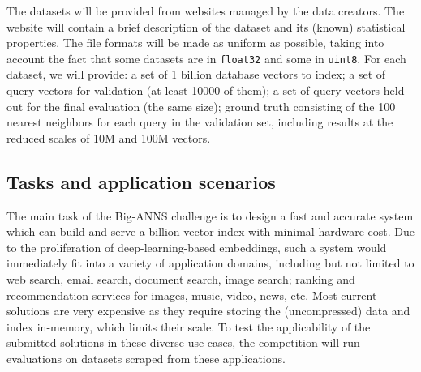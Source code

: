 The datasets will be provided from websites managed by the data creators. 
The website will contain a brief description of the dataset and its (known) statistical properties.
The file formats will be made as uniform as possible, taking into account the fact that some datasets are 
in \texttt{float32} and some in \texttt{uint8}.
For each dataset, we will provide: 
	a set of 1 billion database vectors to index; 
	a set of query vectors for validation (at least 10000 of them); 
	a set of query vectors held out for the final evaluation (the same size);
	ground truth consisting of the 100 nearest neighbors for each query in the validation set, including results at the reduced scales of 10M and 100M vectors.





\subsection{Tasks and application scenarios}

The main task of the Big-ANNS challenge is to design a fast and
accurate system which can build and serve a billion-vector index with
minimal hardware cost.  Due to the proliferation of
deep-learning-based embeddings, such a system would immediately fit
into a variety of application domains, including but not limited to
web search, email search, document search, image search; ranking and
recommendation services for images, music, video, news, etc. Most
current solutions are very expensive as they require storing the
(uncompressed) data and index in-memory, which limits their scale. To
test the applicability of the submitted solutions in these diverse
use-cases, the competition will run evaluations on datasets scraped
from these applications.


